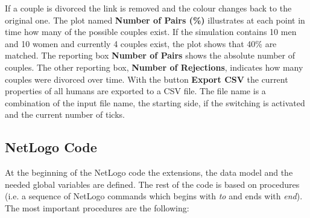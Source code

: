 If a couple is divorced the link is removed and the colour changes back to the original one.
The plot named \textbf{Number of Pairs (\%)} illustrates at each point in time how many of the possible couples exist. 
If the simulation contains 10 men and 10 women and currently 4 couples exist, the plot shows that 40\% are matched.
The reporting box \textbf{Number of Pairs} shows the absolute number of couples.
The other reporting box, \textbf{Number of Rejections}, indicates how many couples were divorced over time.
With the button \textbf{Export CSV} the current properties of all humans are exported to a CSV file.
The file name is a combination of the input file name, the starting side, if the switching is activated and the current number of ticks.

\clearpage
\subsection{NetLogo Code}
At the beginning of the NetLogo code the extensions, the data model and the needed global variables are defined.
The rest of the code is based on procedures (i.e. a sequence of NetLogo commands which begins with \textit{to} and ends with \textit{end}).
The most important procedures are the following:
